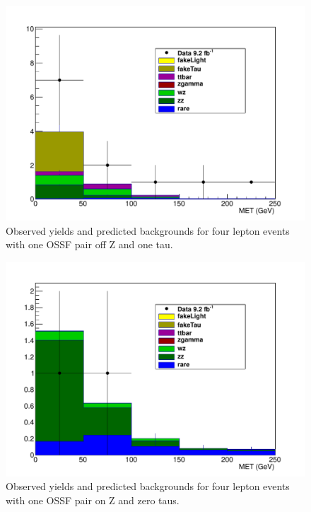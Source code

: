 \begin{figure}[htp]
\begin{center}
\includegraphics[width=1.0\textwidth]{plots/4L_MET_dist_offZ_ossf1_tau1_note.pdf}
\caption{Observed yields and predicted backgrounds for four lepton events with one OSSF pair off Z and one tau.}
\label{fig:L4OSSF1offZtau1}
\end{center}
\end{figure}

\begin{figure}[htp]
\begin{center}
\includegraphics[width=1.0\textwidth]{plots/4L_MET_dist_onZ_ossf1_tau0_note.pdf}
\caption{Observed yields and predicted backgrounds for four lepton events with one OSSF pair on Z and zero taus.}
\label{fig:L4OSSF1onZtau0}
\end{center}
\end{figure}

